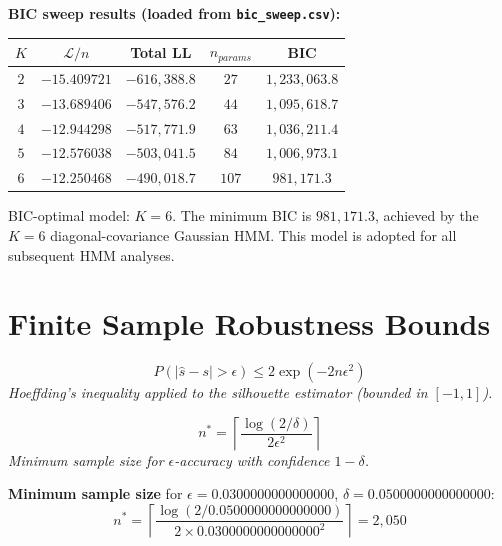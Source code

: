 \documentclass[12pt]{article}
\begin{document}
\noindent\textbf{BIC sweep results (loaded from \texttt{bic\_sweep.csv}):}
\begin{center}\begin{tabular}{ccccc}\toprule
$K$ & $\mathcal{L}/n$ & Total LL & $n_{params}$ & BIC\\ \midrule

$2$ & $-15.409721$ & $-616,388.8$ & $27$ & $1,233,063.8$ \\

$3$ & $-13.689406$ & $-547,576.2$ & $44$ & $1,095,618.7$ \\

$4$ & $-12.944298$ & $-517,771.9$ & $63$ & $1,036,211.4$ \\

$5$ & $-12.576038$ & $-503,041.5$ & $84$ & $1,006,973.1$ \\

$6$ & $-12.250468$ & $-490,018.7$ & $107$ & $981,171.3$ \\

\bottomrule\end{tabular}\end{center}


\noindent BIC-optimal model: $K=6$. The minimum BIC is $981,171.3$, achieved by the $K=6$ diagonal-covariance Gaussian HMM. This model is adopted for all subsequent HMM analyses.



\section{Finite Sample Robustness Bounds}

\begin{equation}
P\!\left(|\hat{s} - s| > \epsilon\right) \leq 2\exp\!\left(-2n\epsilon^2\right)
\end{equation}
\noindent\textit{Hoeffding's inequality applied to the silhouette estimator (bounded in $[-1,1]$).}


\begin{equation}
n^* = \left\lceil \frac{\log(2/\delta)}{2\epsilon^2}\right\rceil
\end{equation}
\noindent\textit{Minimum sample size for $\epsilon$-accuracy with confidence $1-\delta$.}


\noindent\textbf{Minimum sample size} for $\epsilon = 0.0300000000000000$, $\delta = 0.0500000000000000$:
\begin{equation}
n^* = \left\lceil\frac{\log(2/0.0500000000000000)}{2 \times 0.0300000000000000^2}\right\rceil = 2,050
\end{equation}
\end{document}
